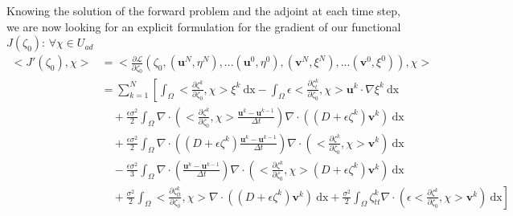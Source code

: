 \documentclass[11pt,a4paper]{article}
\begin{document}
		Knowing the solution of the forward problem and the adjoint at each time step, we are now looking for an explicit formulation for the gradient of our functional $J(\zeta_0)$: $\forall \chi \in U_{ad}$
		\begin{equation*}
			\begin{split}
				<\!J'(\zeta_0),\chi\!> &= <\! \frac{\partial \mathcal{L}}{\partial \zeta_0}(\zeta_0, (\mathbf{u}^N, \eta^N), ... (\mathbf{u}^0, \eta^0), 	(\mathbf{v}^N, \xi^N), ... (\mathbf{v}^0, \xi^0)), \chi\!> \\
				&= \sum^{N}_{k=1} \left[ \int_{\Omega} \! <\!\frac{\partial\zeta^k}{\partial \zeta_0}, \chi\!> \xi^k \: \mathrm{dx} - \int_{\Omega} \! \epsilon <\!\frac{\partial\zeta_t^k}{\partial \zeta_0}, \chi\!> \mathbf{u}^k \cdot \nabla \xi^k \: \mathrm{dx} \right.\\
				& \quad + \frac{\epsilon \sigma^2}{2} \int_{\Omega} \! \nabla \cdot \left( <\!\frac{\partial\zeta^k}{\partial \zeta_0}, \chi\!> \frac{\mathbf{u}^k - \mathbf{u}^{k-1}}{\Delta t} \right) \nabla \cdot \left( (D + \epsilon \zeta^k) \mathbf{v}^k \right) \: \mathrm{dx} \\
				& \quad + \frac{\epsilon \sigma^2}{2} \int_{\Omega} \! \nabla \cdot \left((D+\epsilon \zeta^k)\frac{\mathbf{u}^k - \mathbf{u}^{k-1}}{\Delta t}\right) \nabla \cdot \left(<\!\frac{\partial\zeta^k}{\partial \zeta_0}, \chi\!> \mathbf{v}^k \right) \: \mathrm{dx} \\
				&  \quad - \frac{\epsilon \sigma^2}{3} \int_{\Omega} \! \nabla \cdot \left( \frac{\mathbf{u}^k - \mathbf{u}^{k-1}}{\Delta t} \right) \nabla \cdot \left( <\!\frac{\partial\zeta^k}{\partial \zeta_0}, \chi\!> (D + \epsilon \zeta^k) \mathbf{v}^k \right) \: \mathrm{dx} \\
				& \left. \quad + \frac{\sigma^2}{2}\int_{\Omega} \! <\!\frac{\partial\zeta_{tt}^k}{\partial \zeta_0}, \chi\!> \nabla \cdot \left( (D + \epsilon \zeta^k) \mathbf{v}^k \right) \: \mathrm{dx} + \frac{\sigma^2}{2} \int_{\Omega} \! \zeta_{tt}^k \nabla \cdot \left( \epsilon <\!\frac{\partial\zeta^k}{\partial \zeta_0}, \chi\!> \mathbf{v}^k \right) \: \mathrm{dx} \right]
			\end{split}
		\end{equation*}
		
\end{document}
